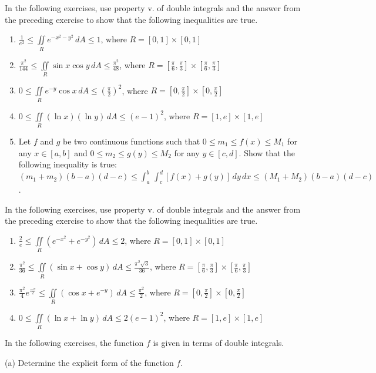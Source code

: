 \documentclass{exercises}
\begin{document}
In the following exercises, use property v. of double integrals and the answer from the preceding exercise to show that the following inequalities are true.

\begin{enumerate}[resume]
\item $\frac{1}{e^{2}}\le \underset{R}{\iint}e^{-x^{2}-y^{2}}\,dA\le1$, where $R=[0,1]\times [0,1]$
\item $\frac{\pi^{2}}{144}\le \underset{R}{\iint}\sin x\cos y\,dA\le \frac{\pi^{2}}{48}$, where $R=[\frac{\pi}{6},\frac{\pi}{3}]\times [\frac{\pi}{6},\frac{\pi}{3}]$
\item $0\le \underset{R}{\iint}e^{-y}\cos x\,dA\le \left( \frac{\pi}{2} \right)^{2}$, where $R=[0,\frac{\pi}{2}]\times [0,\frac{\pi}{2}]$
\item $0\le \underset{R}{\iint}(\ln x)(\ln y)\,dA\le{(e-1)}^{2}$, where $R=[1,e]\times [1,e]$
\item Let $f$ and $g$ be two continuous functions such that $0\le m_{1}\le f(x)\le M_{1}$ for any $x\in[a,b]$ and $0\le m_{2}\le g(y)\le M_{2}$ for any $y\in[c,d]$. Show that the following inequality is true: $(m_{1}+m_{2})(b-a)(d-c)\le \int_{a}^{b}\,\int_{c}^{d}[f(x)+g(y)]\,dy\,dx\le(M_{1}+M_{2})(b-a)(d-c)$.
\end{enumerate}

In the following exercises, use property v. of double integrals and the answer from the preceding exercise to show that the following inequalities are true.

\begin{enumerate}[resume]
\item $\frac{2}{e}\le \underset{R}{\iint}(e^{-x^{2}}+e^{-y^{2}})\,dA\le2$, where $R=[0,1]\times [0,1]$
\item $\frac{\pi^{2}}{36}\le \underset{R}{\iint}(\sin x+\cos y)\,dA\le \frac{\pi^{2}\sqrt{3}}{36}$, where $R=[\frac{\pi}{6},\frac{\pi}{3}]\times [\frac{\pi}{6},\frac{\pi}{3}]$
\item $\frac{\pi^{2}}{4}e^{\frac{-\pi}{2}}\le \underset{R}{\iint}(\cos x+e^{-y})\,dA\le \frac{\pi^{2}}{2}$, where $R=[0,\frac{\pi}{2}]\times [0,\frac{\pi}{2}]$
\item $0\le \underset{R}{\iint}(\ln x+\ln y)\,dA\le2\left( e-1 \right)^{2}$, where $R=[1,e]\times [1,e]$
\end{enumerate}

In the following exercises, the function $f$ is given in terms of double integrals.


(a) Determine the explicit form of the function $f$.
\end{document}
